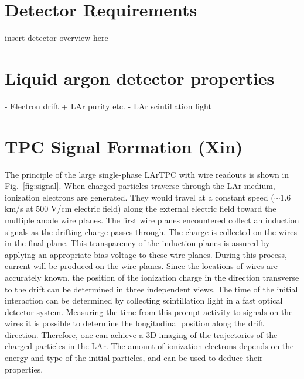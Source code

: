 
\section{Detector Requirements}

insert detector overview here

\section{Liquid argon detector properties}
- Electron drift + LAr purity etc.
- LAr scintillation light 

\section{TPC Signal Formation (Xin)}

The principle of the large single-phase LArTPC with wire readouts is shown in 
Fig.~\ref{fig:signal}. When charged particles traverse through the LAr medium,
ionization electrons are generated. They would travel at a constant speed 
($\sim$1.6 km/s at 500 V/cm electric field) along the external electric field 
toward the multiple anode wire planes. The first wire planes encountered collect 
an induction signals as the drifting charge passes through.  The charge is collected 
on the wires in the final plane. This transparency of the induction planes is assured by 
applying an appropriate bias voltage to these wire planes.
During this process, current will be produced on the wire planes. 
Since the locations of wires are accurately known, the position of the
ionization charge in the direction transverse to the drift can be determined in 
three independent views. The time of the initial interaction can be determined by collecting 
scintillation light 
in a fast optical detector system.
Measuring the time from this prompt activity to signals on the wires it is 
possible to determine the longitudinal position along the drift direction.
Therefore, one can achieve a 3D imaging of the trajectories of the charged particles in the LAr. 
The amount of ionization electrons depends on the energy and type of
the initial particles, and can be used to deduce their properties.

